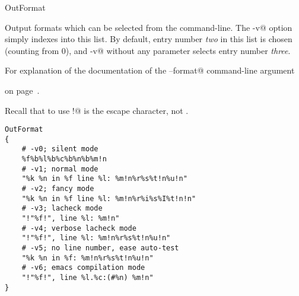 \begin{chktexrclistvar}{OutFormat}

Output formats which can be selected from the command-line.  The
\verb@-v@ option simply indexes into this list.  By default, entry number
\emph{two} in this list is chosen (counting from 0), and \verb@-v@
without any parameter selects entry number \emph{three}.

For explanation of the \verb@%@ format specifiers see the
documentation of the \verb@--format@ command-line argument
\begin{comment}
in the manual.
\end{comment}
on page~\pageref{clarg:format}.

Recall that to use \verb@!@ is the escape character, not \verb@\@.

\chktexrcdefault\begin{verbatim}
OutFormat
{
    # -v0; silent mode
    %f%b%l%b%c%b%n%b%m!n
    # -v1; normal mode
    "%k %n in %f line %l: %m!n%r%s%t!n%u!n"
    # -v2; fancy mode
    "%k %n in %f line %l: %m!n%r%i%s%I%t!n!n"
    # -v3; lacheck mode
    "!"%f!", line %l: %m!n"
    # -v4; verbose lacheck mode
    "!"%f!", line %l: %m!n%r%s%t!n%u!n"
    # -v5; no line number, ease auto-test
    "%k %n in %f: %m!n%r%s%t!n%u!n"
    # -v6; emacs compilation mode
    "!"%f!", line %l.%c:(#%n) %m!n"
}
\end{verbatim}
\end{chktexrclistvar}


